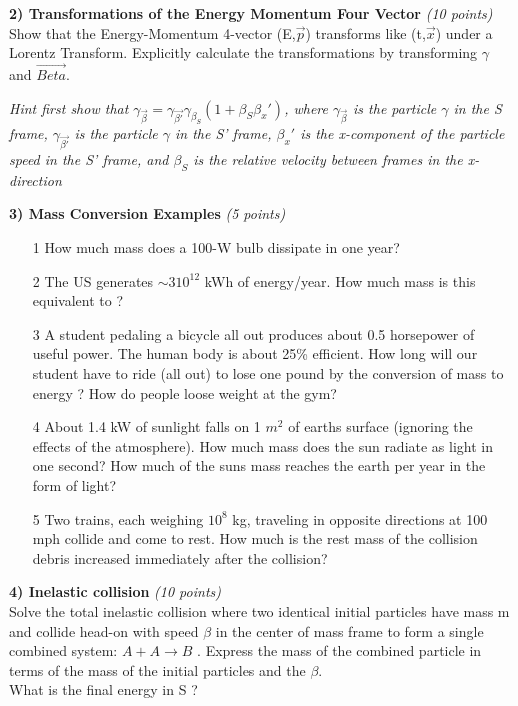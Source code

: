 {\large
\textbf{2) Transformations of the Energy Momentum Four Vector } \hfill \textit{(10 points)}\\
Show that the Energy-Momentum 4-vector (E,$\vec{p}$) transforms like (t,$\vec{x}$) under a Lorentz Transform.
Explicitly calculate the transformations by transforming $\gamma$ and $\vec{Beta}$.

\textit{Hint first show that $\gamma_{\vec{\beta}} = \gamma_{\vec{\beta'}}\gamma_{\beta_S}(1+\beta_{S} \beta_{x}')$,
where $\gamma_{\vec{\beta}}$ is the particle $\gamma$ in the S frame,
      $\gamma_{\vec{\beta'}}$ is the particle $\gamma$ in the S' frame, $\beta_{x}'$ is the x-component of the particle speed in the S' frame, and $\beta_{S}$ is the relative velocity between frames in the x-direction}


\vspace*{0.25in}

\textbf{3) Mass Conversion Examples } \hfill \textit{(5 points)}\\
\begin{itemize}
\item[1] How much mass does a 100-W bulb dissipate in one year?
\item[2] The US generates $\sim 3 10^{12}$ kWh of energy/year. How much mass is this equivalent to ?
\item[3] A student pedaling a bicycle all out produces about 0.5 horsepower of useful power. The human body is about 25\% efficient.
         How long will our student have to ride (all out) to lose one pound by the conversion of mass to energy ? How do people loose weight at the gym?
\item[4] About 1.4 kW of sunlight falls on 1 $m^2$ of earths surface (ignoring the effects of the atmosphere). How much mass does the sun radiate as light in one second?
         How much of the suns mass reaches the earth per year in the form of light?
\item[5] Two trains, each weighing $10^8$ kg, traveling in opposite directions at 100 mph collide and come to rest. How much is the rest mass of the collision debris increased immediately after the collision?
\end{itemize}

\vspace*{0.25in}

\textbf{4) Inelastic collision } \hfill \textit{(10 points)}\\
Solve the total inelastic collision where two identical initial particles have mass m and collide head-on with speed $\beta$ in the center of mass frame to form a single combined system: $A + A \rightarrow B$ . 
Express the mass of the combined particle in terms of the mass of the initial particles and the $\beta$.\\
What is the final energy in S ?

}
